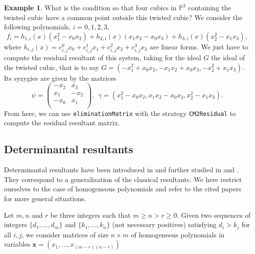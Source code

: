 \documentclass[10pt]{amsart}
\theoremstyle{plain}
\theoremstyle{definition}
\newtheorem{exmp}[thm]{Example}
\def\PP{{\mathbb{P}}}
\def\x{\mathbf{x}}
\begin{document}
\begin{exmp}
 What is the condition so that four cubics in $\PP^3$ containing the twisted cubic have a common point outside this twisted cubic? We consider the following polynomials, $i=0,1,2,3$, 
$$f_i=h_{1,i}(x)(x_1^2-x_0x_2)+h_{2,i}(x)(x_1x_2-x_0x_3)+h_{3,i}(x)(x_2^2-x_1x_3),$$
where
$h_{i,j}(x)=c_{i,j}^0x_0+c_{i,j}^1x_1+c_{i,j}^2x_2+c_{i,j}^3x_3$
are linear forms. We just have to compute the residual resultant of this system, taking for the ideal $G$ the ideal of the twisted cubic, that is to say $G=(-{{x}}_{1}^{2}+{{x}}_{0} {{x}}_{{2}},
-{{x}}_{1} {{x}}_{{2}}+{{x}}_{0} {{x}}_{{3}},
-{{x}}_{{2}}^{2}+{{x}}_{1} {{x}}_{{3}})$. Its syzygies are given by the matrices  
$$\psi=\left(\begin{array}{cc}
        -x_2 & x_3 \\
        x_1 & -x_2 \\
        -x_0 & x_1 \\
        \end{array}\right),\ \ \gamma=({{x}}_{1}^{2}-{{x}}_{0}
      {{x}}_{{2}},
      {{x}}_{1} {{x}}_{{2}}-{{x}}_{0} {{x}}_{{3}},
{{x}}_{{2}}^{2}-{{x}}_{1} {{x}}_{{3}}).$$
From here, we can use {\tt eliminationMatrix} with the strategy {\tt CM2Residual} to compute the residual resultant matrix.
\end{exmp}

\subsection{Determinantal resultants}
Determinantal resultants have been introduced in \cite{BusPhD} and further studied in \cite{Bus04} and \cite{BuGa05}. They correspond to a generalization of the classical resultants. We here restrict ourselves to the case of homogeneous polynomials and refer to the cited papers for more general situations.

Let $m,n$ and $r$ be three integers such that $m\geq n > r \geq 0$. Given two sequences of integers $\{d_1,\ldots,d_m\}$ and $\{k_1,\ldots,k_n\}$ (not necessary positives) satisfying $d_i > k_j$ for all  $i,j$, we consider matrices of size $n\times m$ of homogeneous polynomials in variables $\x=(x_1,\ldots,x_{(m-r)(n-r)})$ 
\end{document}
